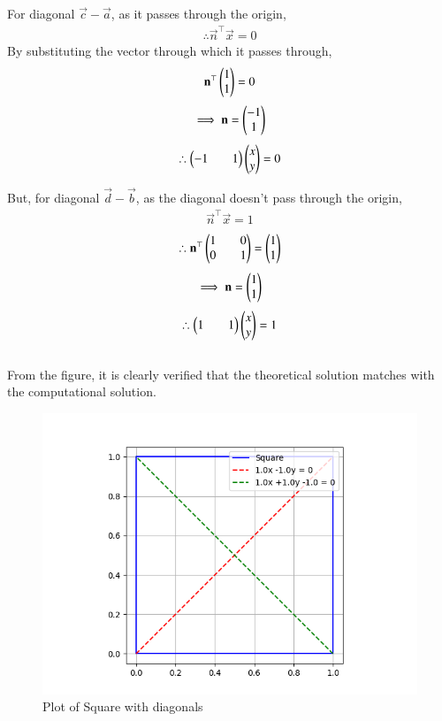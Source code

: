 \documentclass[journal]{IEEEtran}
\begin{document}
For diagonal $\vec{c}-\vec{a}$, as it passes through the origin,
\begin{align}
    \therefore \vec{n}^{\top}\vec{x}=0
\end{align}
By substituting the vector through which it passes through,
\begin{align}
    \mathbf{n}^{\top}\begin{pmatrix}1\\1\end{pmatrix}=0
\end{align}
\begin{align}
    \implies \mathbf{n}=\begin{pmatrix}-1\\1\end{pmatrix}
\end{align}
\begin{align}
    \therefore \begin{pmatrix}-1&&1\end{pmatrix}\begin{pmatrix}x\\y\end{pmatrix}=0
\end{align}
\newpage
\vspace*{0.25cm}

But, for diagonal $\vec{d}-\vec{b}$, as the diagonal doesn't pass through the origin,
\begin{align}
    \vec{n}^{\top}\vec{x}=1
\end{align}
\begin{align}
    \therefore \mathbf{n}^{\top}\begin{pmatrix}1&&0\\0&&1\end{pmatrix}=\begin{pmatrix}1\\1\end{pmatrix}
\end{align}
\begin{align}
    \implies \mathbf{n}=\begin{pmatrix}1\\1\end{pmatrix}
\end{align}
\begin{align}
    \therefore \begin{pmatrix}1&&1\end{pmatrix}\begin{pmatrix}x\\y\end{pmatrix}=1
\end{align}
\\
From the figure, it is clearly verified that the theoretical solution matches with the computational solution.\\
\begin{figure}[H]
    \centering
    \includegraphics[width=0.6\columnwidth]{figs/Figure_1.png}
    \caption*{Plot of Square with diagonals}
    \label{fig:1}
\end{figure}
\end{document}
